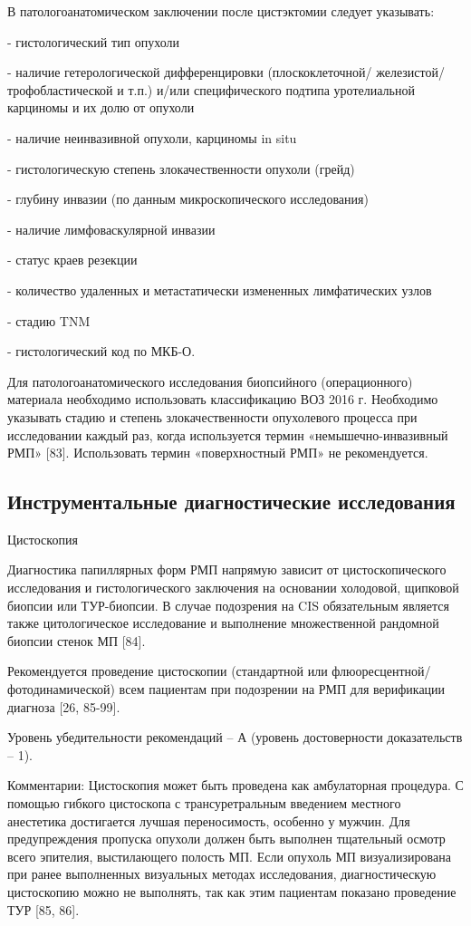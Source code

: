 В патологоанатомическом заключении после цистэктомии следует указывать:

- гистологический тип опухоли

- наличие гетерологической дифференцировки (плоскоклеточной/ железистой/ трофобластической и т.п.) и/или специфического подтипа уротелиальной карциномы и их долю от опухоли

- наличие неинвазивной опухоли, карциномы in situ

- гистологическую степень злокачественности опухоли (грейд)

- глубину инвазии (по данным микроскопического исследования)

-  наличие лимфоваскулярной инвазии

- статус краев резекции

- количество удаленных и метастатически измененных лимфатических узлов

- стадию TNM

- гистологический код по МКБ-О.

Для патологоанатомического исследования биопсийного (операционного) материала необходимо использовать классификацию ВОЗ 2016 г. Необходимо указывать стадию и степень злокачественности опухолевого процесса при исследовании каждый раз, когда используется термин «немышечно-инвазивный РМП» [83]. Использовать термин «поверхностный РМП» не рекомендуется.

\subsection{Инструментальные диагностические исследования}
\label{sec:}
Цистоскопия

Диагностика папиллярных форм РМП напрямую зависит от цистоскопического исследования и гистологического заключения на основании холодовой, щипковой биопсии или ТУР-биопсии. В случае подозрения на CIS обязательным является также цитологическое исследование и выполнение множественной рандомной биопсии стенок МП [84].

Рекомендуется проведение цистоскопии (стандартной или флюоресцентной/фотодинамической) всем пациентам при подозрении на РМП для верификации диагноза [26, 85-99].

Уровень убедительности рекомендаций – А (уровень достоверности доказательств – 1).

Комментарии: Цистоскопия может быть проведена как амбулаторная процедура. С помощью гибкого цистоскопа с трансуретральным введением местного анестетика достигается лучшая переносимость, особенно у мужчин. Для предупреждения пропуска опухоли должен быть выполнен тщательный осмотр всего эпителия, выстилающего полость МП. Если опухоль МП визуализирована при ранее выполненных визуальных методах исследования, диагностическую цистоскопию можно не выполнять, так как этим пациентам показано проведение ТУР [85, 86].

